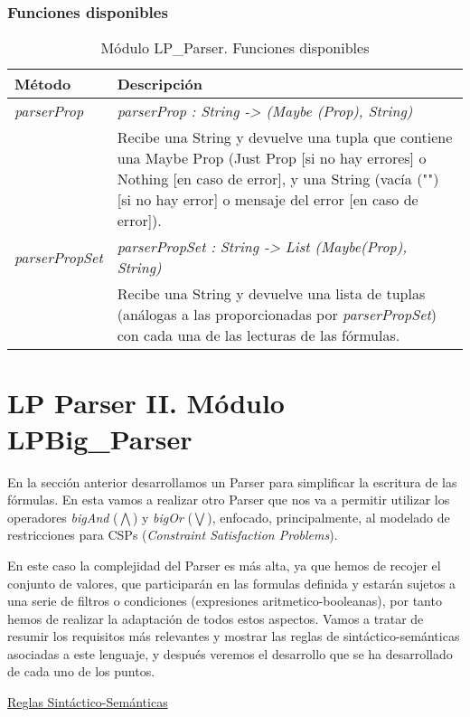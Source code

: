 \documentclass[a4paper]{report}
\begin{document}
\subsubsection{Funciones disponibles}

\begin{table}[H]
\centering
\begin{tabular}{p{3cm} p{13.2cm}}
\hline
Método & Descripción\\
\hline
\hline
\textit{parserProp}& \textit{parserProp : String -> (Maybe (Prop), String)}\\
& Recibe una String y devuelve una tupla que contiene una Maybe Prop (Just Prop [si no hay errores] o Nothing [en caso de error], y una String (vacía ("") [si no hay error] o mensaje del error [en caso de error]).\\
\hline
\textit{parserPropSet}& \textit{parserPropSet : String -> List (Maybe(Prop), String)}\\
& Recibe una String y devuelve una lista de tuplas (análogas a las proporcionadas por \textit{parserPropSet}) con cada una de las lecturas de las fórmulas.\\
\hline
\end{tabular}
\caption{Módulo LP\_Parser. Funciones disponibles}
\end{table}

\section{LP Parser II. Módulo LPBig\_Parser}
En la sección anterior desarrollamos un Parser para simplificar la escritura de las fórmulas. En esta vamos a realizar otro Parser que nos va a permitir utilizar los operadores \textit{bigAnd} ($\bigwedge$) y \textit{bigOr} ($\bigvee$), enfocado, principalmente, al modelado de restricciones para CSPs (\textit{Constraint Satisfaction Problems}).

En este caso la complejidad del Parser es más alta, ya que hemos de recojer el conjunto de valores, que participarán en las formulas definida y estarán sujetos a una serie de filtros o condiciones (expresiones aritmetico-booleanas), por tanto hemos de realizar la adaptación de todos estos aspectos. Vamos a tratar de resumir los requisitos más relevantes y mostrar las reglas de sintáctico-semánticas asociadas a este lenguaje, y después veremos el desarrollo que se ha desarrollado de cada uno de los puntos.

\noindent\underline{Reglas Sintáctico-Semánticas}
\end{document}
